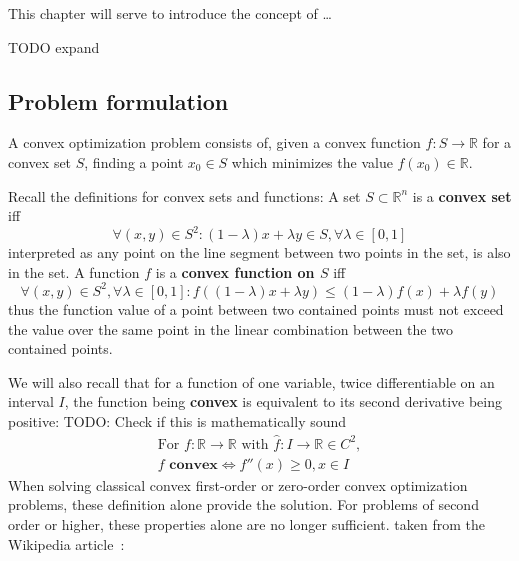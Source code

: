 \documentclass[../convex_optimization.tex]{subfiles}
\begin{document}
This chapter will serve to introduce the concept of \ldots

TODO expand

\subsection{Problem formulation}
A convex optimization problem consists of, given a convex function
$f: S \to \mathbb R$ for a convex set $S$, finding
a point $x_0 \in S$ which minimizes the value $f(x_0) \in \mathbb R$.

Recall the definitions for convex sets and functions:
A set $S \subset \mathbb R^n$ is a \textbf{convex set} iff
\begin{equation}
    \forall (x, y) \in S^2: (1-\lambda)x + \lambda y \in S,
    \forall \lambda \in [0, 1]
    \label{convex_set}
\end{equation}
interpreted as any point on the line segment between two points in the set,
is also in the set.
A function $f$ is a \textbf{convex function on $S$} iff
\begin{equation}
    \forall (x, y) \in S^2, \forall \lambda \in [0, 1]:
    f((1-\lambda)x + \lambda y) \leq (1-\lambda)f(x) + \lambda f(y)
    \label{convex_function}
\end{equation}
thus the function value of a point between two contained points must
not exceed the value over the same point in the linear combination between the two contained points.

We will also recall that for a function of one variable,
twice differentiable on an interval $I$,
the function being \textbf{convex} is equivalent to its second derivative
being positive:
TODO: Check if this is mathematically sound
\begin{equation} \label{convex_corollary}
\begin{gathered}
    \text{For } f: \mathbb R \to \mathbb R
    \text{ with }\hat{f}: I \to \mathbb R \in C^2, \\
    f \textbf{ convex} \iff f''(x) \geq 0, x \in I
\end{gathered}
\end{equation}
When solving classical convex first-order or zero-order convex
optimization problems, these definition alone provide the solution.
For problems of second order or higher, these properties alone are
no longer sufficient.
\newpage
taken from the Wikipedia article~\cite{hessian_wiki}:
\end{document}
